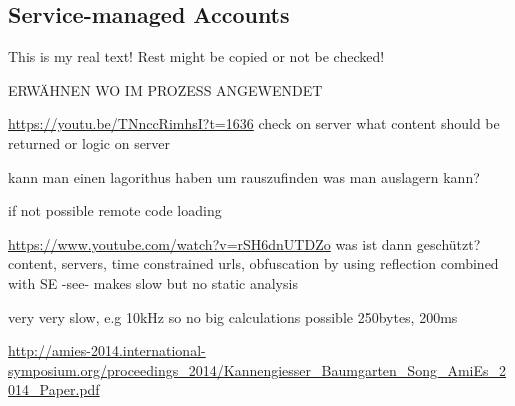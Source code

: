 \subsection{Service-managed Accounts} \label{subsection:evaluation-external-service}
This is my real text! Rest might be copied or not be checked!

ERWÄHNEN WO IM PROZESS ANGEWENDET\newline


\url{https://youtu.be/TNnccRimhsI?t=1636}\newline
check on server what content should be returned or logic on server\newline

kann man einen lagorithus haben um rauszufinden was man auslagern kann?\newline

if not possible remote code loading\newline

\url{https://www.youtube.com/watch?v=rSH6dnUTDZo}
was ist dann geschützt? content, servers, time constrained urls, obfuscation by using reflection combined with SE -see- makes slow but no static analysis\newline

very very slow, e.g 10kHz so no big calculations possible\newline
250bytes, 200ms \newline

\url{http://amies-2014.international-symposium.org/proceedings_2014/Kannengiesser_Baumgarten_Song_AmiEs_2014_Paper.pdf}\newline
